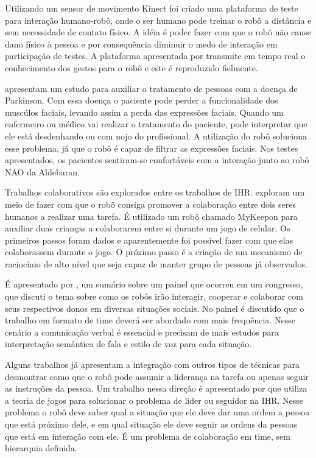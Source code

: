 Utilizando um sensor de movimento Kinect foi criado uma plataforma de teste para interação humano-robô, onde o ser humano pode treinar o robô a distância e sem necessidade de contato físico. A idéia é poder fazer com que o robô não cause dano físico à pessoa e por consequência diminuir o medo de interação em participação de testes. A plataforma apresentada por \textcite{rossmann:2013} transmite em tempo real o conhecimento dos gestos para o robô e este é reproduzido fielmente.

\textcite{briggs:2015} apresentam um estudo para auxiliar o tratamento de pessoas com a doença de Parkinson. Com essa doença o paciente pode perder a funcionalidade dos muscúlos faciais, levando assim a perda das expressões faciais. Quando um enfermeiro ou médico vai realizar o tratamento do paciente, pode interpretar que ele está desdenhando ou com nojo do profissional. A utilização do robô soluciona esse problema, já que o robô é capaz de filtrar as expressões faciais. Nos testes apresentados, os pacientes sentiram-se confortáveis com a interação junto ao robô NAO da Aldebaran.

Trabalhos colaborativos são explorados entre os trabalhos de IHR. \textcite{strohkorb:2016} exploram um meio de fazer com que o robô consiga promover a colaboração entre dois seres humanos a realizar uma tarefa. É utilizado um robô chamado MyKeepon para auxiliar duas crianças a colaborarem entre si durante um jogo de celular. Os primeiros passos foram dados e aparentemente foi possível fazer com que elas colaborassem durante o jogo. O próximo passo é a criação de um mecanismo de raciocínio de alto nível que seja capaz de manter grupo de pessoas já observados.

É apresentado por \textcite{lampe:2016}, um sumário sobre um painel que ocorreu em um congresso, que discuti o tema sobre como os robôs irão interagir, cooperar e colaborar com seus respectivos donos em diversas situações sociais. No painel é discutido que o trabalho em formato de time deverá ser abordado com mais frequência. Nesse cenário a comunicação verbal é essencial e precisam de mais estudos para interpretação semântica de fala e estilo de voz para cada situação.

Alguns trabalhos já apresentam a integração com outros tipos de técnicas para desmontrar como que o robô pode assumir a liderança na tarefa ou apenas seguir as instruções da pessoa. Um trabalho nessa direção é apresentado por \textcite{li:2015} que utiliza a teoria de jogos para solucionar o problema de lider ou seguidor na IHR. Nesse problema o robô deve saber qual a situação que ele deve dar uma ordem a pessoa que está próximo dele, e em qual situação ele deve seguir as ordens da pessoas que está em interação com ele. É um problema de colaboração em time, sem hierarquia definida.

